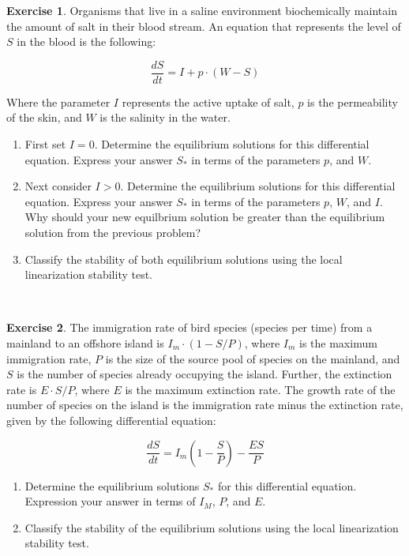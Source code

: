 \documentclass[
]{book}
\theoremstyle{definition}
\theoremstyle{definition}
\theoremstyle{definition}
\newtheorem{exercise}{Exercise}[chapter]
\theoremstyle{remark}
\begin{document}
\begin{exercise}
\protect\hypertarget{exr:unnamed-chunk-92}{}{\label{exr:unnamed-chunk-92} }Organisms that live in a saline environment biochemically maintain the amount of salt in their blood stream. An equation that represents the level of \(S\) in the blood is the following:

\[ \frac{dS}{dt} = I + p \cdot (W - S) \]

Where the parameter \(I\) represents the active uptake of salt, \(p\) is the permeability of the skin, and \(W\) is the salinity in the water.

\begin{enumerate}[label=\alph*.]
\item First set $I=0$.  Determine the equilibrium solutions for this differential equation. Express your answer $S_{*}$ in terms of the parameters $p$, and $W$.
\item Next consider $I>0$.  Determine the equilibrium solutions for this differential equation. Express your answer $S_{*}$ in terms of the parameters $p$, $W$, and $I$.  Why should your new equilbrium solution be greater than the equilibrium solution from the previous problem?
\item Classify the stability of both equilibrium solutions using the local linearization stability test.
\end{enumerate}
\end{exercise}

~

\begin{exercise}
\protect\hypertarget{exr:unnamed-chunk-93}{}{\label{exr:unnamed-chunk-93} }The immigration rate of bird species (species per time) from a mainland to an offshore island is \(I_{m} \cdot (1-S/P)\), where \(I_{m}\) is the maximum immigration rate, \(P\) is the size of the source pool of species on the mainland, and \(S\) is the number of species already occupying the island. Further, the extinction rate is \(E \cdot S / P\), where \(E\) is the maximum extinction rate. The growth rate of the number of species on the island is the immigration rate minus the extinction rate, given by the following differential equation:

\begin{equation} \frac{dS}{dt} = I_{m} \left(1-\frac{S}{P} \right) - \frac{ES}{P}
\end{equation}

\begin{enumerate}[label=\alph*.]
\item Determine the equilibrium solutions $S_{*}$ for this differential equation. Expression your answer in terms of $I_{M}$, $P$, and $E$.
\item Classify the stability of the equilibrium solutions using the local linearization stability test.
\end{enumerate}
\end{exercise}
\end{document}
